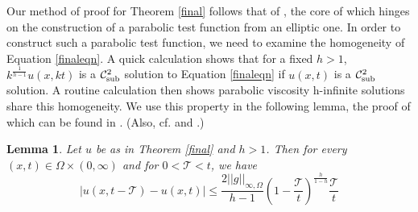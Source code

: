 \documentclass[12pt]{amsart}
\newtheorem{lemma}[thm]{Lemma}
\theoremstyle{definition}
\theoremstyle{remark}
\numberwithin{equation}{section}
\begin{document}
Our method of proof for Theorem \ref{final} follows that of \cite[Theorem 2]{J:PD}, the core of which hinges on the construction of a parabolic test function from an elliptic one.  In order to construct such a parabolic test function, we need to examine the homogeneity of Equation \eqref{finaleqn}. A quick calculation shows that for a fixed $h>1$, $k^{\frac{1}{h-1}}u(x,kt)$ is a ${\operatorname{\mathcal{C}^2_{\textmd{sub}}}}$ solution to Equation \eqref{finaleqn} if $u(x,t)$ is a ${\operatorname{\mathcal{C}^2_{\textmd{sub}}}}$ solution. A routine calculation then shows parabolic viscosity h-infinite solutions share this homogeneity.  We use this property in the following lemma, the proof of which can be found in  \cite[pg. 170]{DiB}. (Also, cf. \cite[Lemma 6.2] {BM} and \cite{J:PD}.)
\begin{lemma}\label{bounduth}
Let $u$ be as in Theorem \ref{final} and $h>1$.  Then for every $(x,t) \in \Omega \times (0,\infty)$ and for $0 < \mathcal{T}< t$, we have
\begin{equation*}
|u(x,t-\mathcal{T}) - u(x,t)|  \leq  \frac{2 ||g||_{\infty,\Omega}}{h-1}\left(1-\frac{\mathcal{T}}{t}\right)^{\frac{h}{1-h}}\frac{\mathcal{T}}{t} 
\end{equation*}
\end{lemma}
\end{document}
